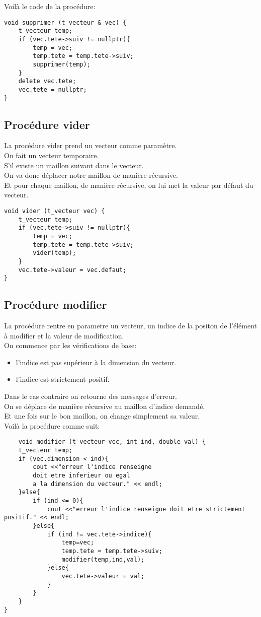 \documentclass[a4paper,11pt,final]{article}
\begin{document}
\pagebreak
Voilà le code de la procédure:
\begin{verbatim}
void supprimer (t_vecteur & vec) {
    t_vecteur temp;
    if (vec.tete->suiv != nullptr){
        temp = vec;
        temp.tete = temp.tete->suiv;
        supprimer(temp);
    }
    delete vec.tete;
    vec.tete = nullptr;
}
\end{verbatim}

\subsection{Procédure vider}
La procédure vider prend un vecteur comme paramètre.\\
On fait un vecteur temporaire.\\
S'il existe un maillon suivant dans le vecteur.\\
On va donc déplacer notre maillon de manière récursive.\\
Et pour chaque maillon, de manière récursive, on lui met la valeur par défaut du vecteur.
\begin{verbatim}
void vider (t_vecteur vec) {
    t_vecteur temp;
    if (vec.tete->suiv != nullptr){
        temp = vec;
        temp.tete = temp.tete->suiv;
        vider(temp);
    }
    vec.tete->valeur = vec.defaut;
}
\end{verbatim}

\subsection{Procédure modifier}
La procédure rentre en parametre un vecteur, un indice de la positon de l'élément à modifier et la valeur de modification.\\
On commence par les vérifications de base:
\begin{itemize}
    \item l'indice est pas supérieur à la dimension du vecteur.
    \item l'indice est strictement positif.
\end{itemize}
Dans le cas contraire on retourne des messages d'erreur.\\
On se déplace de manière récursive au maillon d'indice demandé.\\
Et une fois sur le bon maillon, on change simplement sa valeur.\\

\pagebreak
Voilà la procédure comme suit:
\begin{verbatim}
    void modifier (t_vecteur vec, int ind, double val) {
    t_vecteur temp;
    if (vec.dimension < ind){
        cout <<"erreur l'indice renseigne
        doit etre inferieur ou egal
        a la dimension du vecteur." << endl;
    }else{
        if (ind <= 0){
            cout <<"erreur l'indice renseigne doit etre strictement positif." << endl;
        }else{
            if (ind != vec.tete->indice){
                temp=vec;
                temp.tete = temp.tete->suiv;
                modifier(temp,ind,val);
            }else{
                vec.tete->valeur = val;
            }
        }
    }
}
\end{verbatim}
\end{document}
